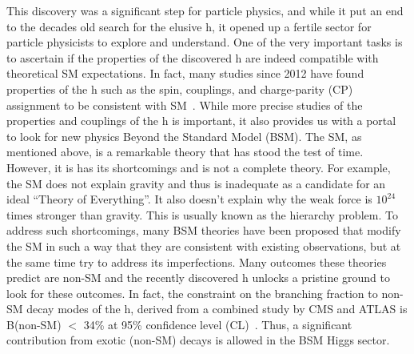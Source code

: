 This discovery was a significant step for particle physics, and while it put an end to the decades old search for the elusive h, it opened up a fertile sector for particle physicists to explore and understand. One of the very important tasks is to ascertain if the properties of the discovered h are indeed compatible with theoretical SM expectations. In fact, many studies since 2012 have found properties of the h such as the spin, couplings, and charge-parity (CP) assignment to be consistent with SM~\cite{JHEP2016:45}. While more precise studies of the properties and couplings of the h is important, it also provides us with a portal to look for new physics Beyond the Standard Model (BSM). The SM, as mentioned above, is a remarkable theory that has stood the test of time. However, it is has its shortcomings and is not a complete theory. For example, the SM does not explain gravity and thus is inadequate as a candidate for an ideal ``Theory of Everything''. It also doesn't explain why the weak force is $10^{24}$ times stronger than gravity. This is usually known as the hierarchy problem. To address such shortcomings, many BSM theories have been proposed that modify the SM in such a way that they are consistent with existing observations, but at the same time try to address its imperfections. Many outcomes these theories predict are non-SM and the recently discovered h unlocks a pristine ground to look for these outcomes. In fact, the constraint on the branching fraction to non-SM decay modes of the h, derived from a combined study by CMS and ATLAS is B(non-SM) $<$ 34\% at 95\% confidence level (CL)~\cite{JHEP2016:45}. Thus, a significant contribution from exotic (non-SM) decays is allowed in the BSM Higgs sector.

